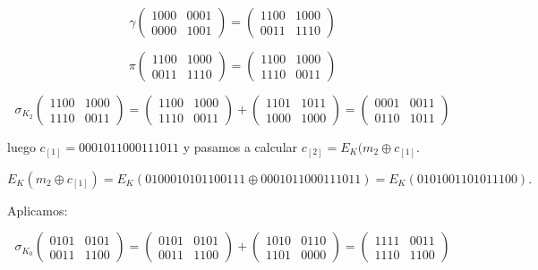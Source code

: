 \documentclass[a4paper]{article}
\begin{document}
$$\gamma \begin{pmatrix} 1000 & 0001 \\ 0000 & 1001 \end{pmatrix} = \begin{pmatrix} 1100 & 1000 \\ 0011 & 1110 \end{pmatrix}$$

$$\pi \begin{pmatrix} 1100 & 1000 \\ 0011 & 1110 \end{pmatrix} = \begin{pmatrix} 1100 & 1000 \\ 1110 & 0011 \end{pmatrix}$$

$$\sigma_{K_2} \begin{pmatrix} 1100 & 1000 \\ 1110 & 0011 \end{pmatrix} = \begin{pmatrix} 1100 & 1000 \\ 1110 & 0011 \end{pmatrix} + \begin{pmatrix} 1101 & 1011 \\ 1000 & 1000 \end{pmatrix} = \begin{pmatrix} 0001 & 0011 \\ 0110 & 1011 \end{pmatrix}$$

luego $c_{[1]} = 0001 0110 0011 1011$ y pasamos a calcular $c_{[2]} = E_K(m_2 \oplus c_{[1]}$.

$$E_K(m_2 \oplus c_{[1]}) = E_K( 0100 0101 0110 0111 \oplus 0001 0110 0011 1011) = E_K(0101 0011 0101 1100).$$

Aplicamos:

$$\sigma_{K_0} \begin{pmatrix} 0101 & 0101 \\ 0011 & 1100 \end{pmatrix} = \begin{pmatrix} 0101 & 0101 \\ 0011 & 1100 \end{pmatrix} + \begin{pmatrix} 1010 & 0110 \\ 1101 & 0000 \end{pmatrix} = \begin{pmatrix} 1111 & 0011 \\ 1110 & 1100 \end{pmatrix}$$
\end{document}

